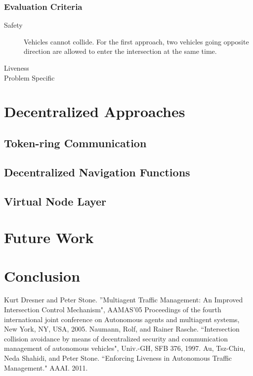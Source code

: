 \documentclass[12pt]{article}
\begin{document}
\subsubsection{Evaluation Criteria}

\begin{description}
\item[Safety] Vehicles cannot collide.   For the first approach, two vehicles going opposite direction are allowed to enter the intersection at the same time.
\item[Liveness]
\item[Problem Specific]
\end{description}

\section{Decentralized Approaches}
\label{sec:decentralizedApproaches}
\subsection{Token-ring Communication}
\label{sec:tokenRing}
\subsection{Decentralized Navigation Functions}
\label{sec:DNF}
\subsection{Virtual Node Layer}
\label{sec:VNLayer}

\section{Future Work}
\label{sec:futureWork}

\section{Conclusion}
\label{sec:conclusion}


\begin{thebibliography}{9}

Kurt Dresner and Peter Stone. ''Multiagent Traffic Management: An Improved Intersection
Control Mechanism", AAMAS'05 Proceedings of the fourth international joint conference on Autonomous agents and multiagent systems, New York, NY, USA, 2005.
Naumann, Rolf, and Rainer Rasche. ``Intersection collision avoidance by means of decentralized security and communication management of autonomous vehicles", Univ.-GH, SFB 376, 1997.
Au, Tsz-Chiu, Neda Shahidi, and Peter Stone. ``Enforcing Liveness in Autonomous Traffic Management." AAAI. 2011.
\end{thebibliography}
\end{document}
